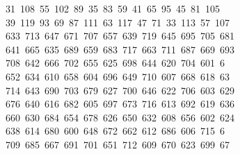 \begin{tabbing}
\ 31\ 108\ 55\ 102\ 89\ 35\ 83\ 59\ 41\ 65\ 95\ 45\ 81\ 105\\[0pt]
\>\ 39\ 119\ 93\ 69\ 87\ 111\ 63\ 117\ 47\ 71\ 33\ 113\ 57\ 107\\[0pt]
\>\ 633\ 713\ 647\ 671\ 707\ 657\ 639\ 719\ 645\ 695\ 705\ 681\\[0pt]
\>\ 641\ 665\ 635\ 689\ 659\ 683\ 717\ 663\ 711\ 687\ 669\ 693\ \\[0pt]
\ 708\ 642\ 666\ 702\ 655\ 625\ 698\ 644\ 620\ 704\ 601\ 6\\[0pt]
\ 652\ 634\ 610\ 658\ 604\ 696\ 649\ 710\ 607\ 668\ 618\ 63\\[0pt]
\ 714\ 643\ 690\ 703\ 679\ 627\ 700\ 646\ 622\ 706\ 603\ 629\\[0pt]
\>\ 676\ 640\ 616\ 682\ 605\ 697\ 673\ 716\ 613\ 692\ 619\ 636\\[0pt]
\>\ 660\ 630\ 684\ 654\ 678\ 626\ 650\ 632\ 608\ 656\ 602\ 624\ \\[0pt]
\ 638\ 614\ 680\ 600\ 648\ 672\ 662\ 612\ 686\ 606\ 715\ 6\\[0pt]
\ 709\ 685\ 667\ 691\ 701\ 651\ 712\ 609\ 670\ 623\ 699\ 67\\[0pt]

\end{tabbing}

